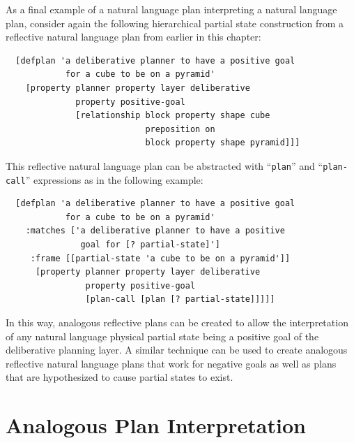 As a final example of a natural language plan interpreting a natural
language plan, consider again the following hierarchical partial state
construction from a reflective natural language plan from earlier in
this chapter:
\begin{samepage}
\begin{Verbatim}
  [defplan 'a deliberative planner to have a positive goal
            for a cube to be on a pyramid'
    [property planner property layer deliberative
              property positive-goal
              [relationship block property shape cube
                            preposition on
                            block property shape pyramid]]]
\end{Verbatim}
\end{samepage}
This reflective natural language plan can be abstracted with
``{\tt{plan}}'' and ``{\tt{plan-call}}'' expressions as in the
following example:
\begin{samepage}
\begin{Verbatim}
  [defplan 'a deliberative planner to have a positive goal
            for a cube to be on a pyramid'
    :matches ['a deliberative planner to have a positive
               goal for [? partial-state]']
     :frame [[partial-state 'a cube to be on a pyramid']]
      [property planner property layer deliberative
                property positive-goal
                [plan-call [plan [? partial-state]]]]]
\end{Verbatim}
\end{samepage}
In this way, analogous reflective plans can be created to allow the
interpretation of any natural language physical partial state being a
positive goal of the deliberative planning layer.  A similar technique
can be used to create analogous reflective natural language plans that
work for negative goals as well as plans that are hypothesized to
cause partial states to exist.

\section{Analogous Plan Interpretation}

